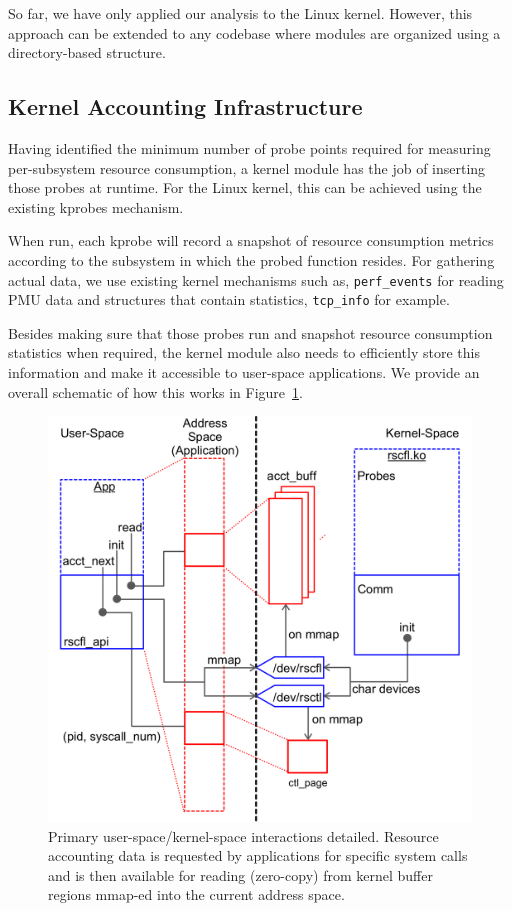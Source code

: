 \documentclass[letterpaper,twocolumn,10pt]{article}
\begin{document}
So far, we have only applied our analysis to the Linux kernel. However, this
approach can be extended to any codebase where modules are organized using a
directory-based structure.


\subsection{Kernel Accounting Infrastructure}

Having identified the minimum number of probe points required for measuring per-subsystem
resource consumption, a kernel module has the job of inserting those probes at runtime.
For the Linux kernel, this can be achieved using the existing kprobes mechanism.

When run, each kprobe will record a snapshot of resource consumption metrics according
to the subsystem in which the probed function resides. For gathering actual data, we
use existing kernel mechanisms such as, \texttt{perf\_events} for reading PMU
data and structures that contain statistics, \texttt{tcp\_info} for example.

Besides making sure that those probes run and snapshot resource consumption statistics
when required, the kernel module also needs to efficiently store this information
and make it accessible to user-space applications. We provide an overall schematic of
how this works in Figure~\ref{fig:design}.

\begin{figure}[ht!] 
	\centering 
	\includegraphics[width=1.1\columnwidth]{sys_design}
	\caption{Primary user-space/kernel-space interactions detailed. Resource
accounting data is requested by applications for specific system calls and is
then available for reading (zero-copy) from kernel buffer regions mmap-ed into
the current address space. } 
	\label{fig:design}
\end{figure}
\end{document}
